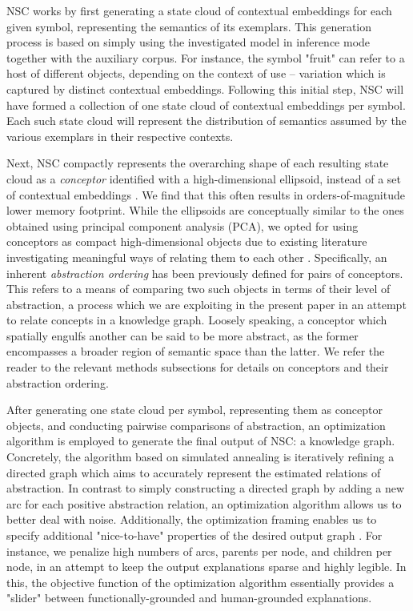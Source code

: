 NSC works by first generating a state cloud of contextual embeddings for each given symbol, representing the semantics of its exemplars. This generation process is based on simply using the investigated model in inference mode together with the auxiliary corpus. For instance, the symbol "fruit" can refer to a host of different objects, depending on the context of use -- variation which is captured by distinct contextual embeddings. Following this initial step, NSC will have formed a collection of one state cloud of contextual embeddings per symbol. Each such state cloud will represent the distribution of semantics assumed by the various exemplars in their respective contexts.

Next, NSC compactly represents the overarching shape of each resulting state cloud as a \textit{conceptor} identified with a high-dimensional ellipsoid, instead of a set of contextual embeddings \citep{jaeger_controlling_2017}. We find that this often results in orders-of-magnitude lower memory footprint. While the ellipsoids are conceptually similar to the ones obtained using principal component analysis (PCA), we opted for using conceptors as compact high-dimensional objects due to existing literature investigating meaningful ways of relating them to each other \citep{jaeger_controlling_2017}. Specifically, an inherent \textit{abstraction ordering} has been previously defined for pairs of conceptors. This refers to a means of comparing two such objects in terms of their level of abstraction, a process which we are exploiting in the present paper in an attempt to relate concepts in a knowledge graph. Loosely speaking, a conceptor which spatially engulfs another can be said to be more abstract, as the former encompasses a broader region of semantic space than the latter. We refer the reader to the relevant methods subsections for details on conceptors and their abstraction ordering.

After generating one state cloud per symbol, representing them as conceptor objects, and conducting pairwise comparisons of abstraction, an optimization algorithm is employed to generate the final output of NSC: a knowledge graph. Concretely, the algorithm based on simulated annealing is iteratively refining a directed graph which aims to accurately represent the estimated relations of abstraction. In contrast to simply constructing a directed graph by adding a new arc for each positive abstraction relation, an optimization algorithm allows us to better deal with noise. Additionally, the optimization framing enables us to specify additional "nice-to-have" properties of the desired output graph \citep{madsen_post-hoc_2021}. For instance, we penalize high numbers of arcs, parents per node, and children per node, in an attempt to keep the output explanations sparse and highly legible. In this, the objective function of the optimization algorithm essentially provides a "slider" between functionally-grounded and human-grounded explanations.

